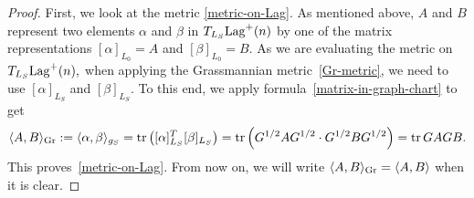 \documentclass[11pt]{amsart}
\numberwithin{equation}{section}
\theoremstyle{definition}
\theoremstyle{definition}
\newcommand{\pair}[1]{\langle #1\rangle}
\newcommand{\pr}[1]{\left(#1\right)}
\newcommand{\tr}{\text{tr}}
\begin{document}
\begin{proof}
	First, we look at the metric \eqref{metric-on-Lag}. 
	As mentioned above, $A$ and $B$ represent two elements $\alpha$ and $\beta$ in $T_{L_S}{\rm Lag}^+(n)$ by one of the matrix representations $[\alpha]_{L_0}=A$ and $[\beta]_{L_0}=B.$
	As we are evaluating the metric on $T_{L_S}{\rm Lag}^+(n),$ when applying the Grassmannian metric~\eqref{Gr-metric}, we need to use $[\alpha]_{L_S}$ and $[\beta]_{L_S}.$
	To this end, we apply formula~\eqref{matrix-in-graph-chart} to get
	\begin{align*}
	\pair{A,B}_{\rm Gr}
	:= \pair{\alpha,\beta}_{g_S}
	= \tr \pr{[\alpha]_{L_S}^T [\beta]_{L_S}}
	= \tr \pr{G^{1/2}AG^{1/2} \cdot G^{1/2}BG^{1/2}}
	= \tr\, GAGB.
	\end{align*}
	This proves~\eqref{metric-on-Lag}.
	From now on, we will write $\pair{A,B}_{\rm Gr}
	= \pair{A,B}$ when it is clear.
	

\end{proof}
\end{document}
